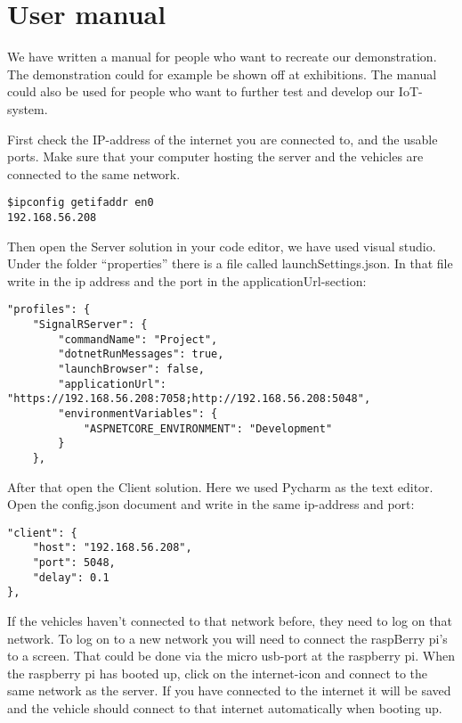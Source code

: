 \section{User manual}
We have written a manual for people who want to recreate our demonstration. The demonstration could for example be shown off at exhibitions. The manual could also be used for people who want to further test and develop our IoT-system.

First check the IP-address of the internet you are connected to, and the usable ports. Make sure that your computer hosting the server and the vehicles are connected to the same network.

\begin{lstlisting}
$ipconfig getifaddr en0
192.168.56.208
\end{lstlisting}

Then open the Server solution in your code editor, we have used visual studio. Under the folder “properties” there is a file called launchSettings.json. In that file write in the ip address and the port in the applicationUrl-section:

\clearpage
\begin{lstlisting}
"profiles": {
	"SignalRServer": {
		"commandName": "Project",
		"dotnetRunMessages": true,
		"launchBrowser": false,
		"applicationUrl": "https://192.168.56.208:7058;http://192.168.56.208:5048",
		"environmentVariables": {
			"ASPNETCORE_ENVIRONMENT": "Development"
		}
	},
\end{lstlisting}

After that open the Client solution. Here we used Pycharm as the text editor. Open the config.json document and write in the same ip-address and port:

\begin{lstlisting}
"client": {
	"host": "192.168.56.208",
	"port": 5048,
	"delay": 0.1
},
\end{lstlisting}

If the vehicles haven’t connected to that network before, they need to log on that network. To log on to a new network you will need to connect the raspBerry pi’s to a screen. That could be done via the micro usb-port at the raspberry pi. When the raspberry pi has booted up, click on the internet-icon and connect to the same network as the server. If you have connected to the internet it will be saved and the vehicle should connect to that internet automatically when booting up. 

